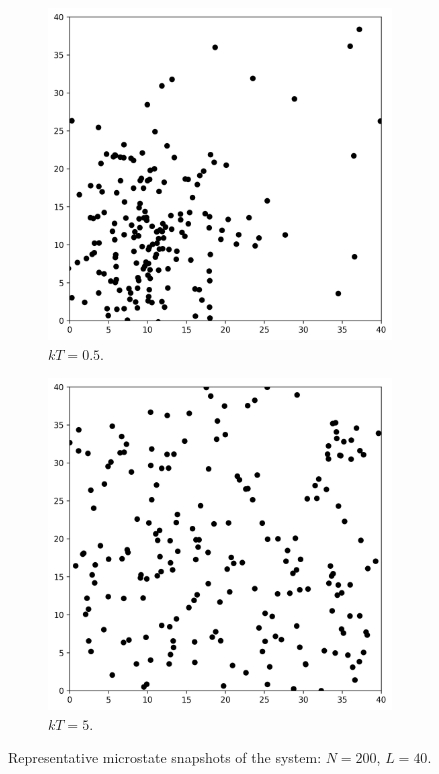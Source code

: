 \documentclass{article}
\begin{document}
\begin{figure}[H]
\centering
\begin{subfigure}{.5\textwidth}
  \centering
  \includegraphics[width=.9\linewidth]{homework9/1a.png}
  \caption{$kT=0.5$.}
  \label{fig:kT0.5}
\end{subfigure}%
\begin{subfigure}{.5\textwidth}
  \centering
  \includegraphics[width=.9\linewidth]{homework9/1b.png}
  \caption{$kT=5$.}
  \label{fig:kT5.0}
\end{subfigure}
\caption{Representative microstate snapshots of the system: $N=200$, $L=40$.}
\label{fig:p1}
\end{figure}
\end{document}
